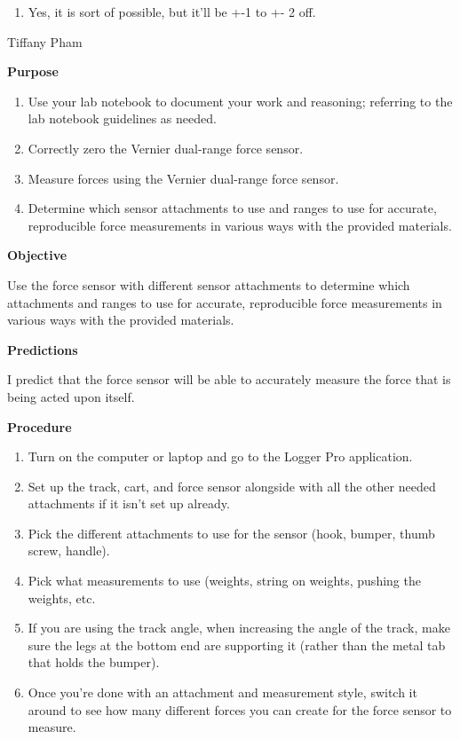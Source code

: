 \documentclass[idxtotoc,hyperref,openany]{labbook} %
\begin{document}

\begin{enumerate}
    \item Yes, it is sort of possible, but it'll be +-1 to +- 2 off.
\end{enumerate}


\vspace{-5mm}
Tiffany Pham

\textbf{Purpose}
\begin{enumerate}
    \item Use your lab notebook to document your work and reasoning; referring to the lab notebook guidelines as needed.
    \item Correctly zero the Vernier dual-range force sensor.
    \item Measure forces using the Vernier dual-range force sensor.
    \item Determine which sensor attachments to use and ranges to use for accurate, reproducible force measurements in various ways with the provided materials.
\end{enumerate}

\hfill \break
\textbf{Objective}

Use the force sensor with different sensor attachments to determine which attachments and ranges to use for accurate, reproducible force measurements in various ways with the provided materials.

\hfill \break
\textbf{Predictions}

I predict that the force sensor will be able to accurately measure the force that is being acted upon itself.

\hfill \break
\textbf{Procedure}
\begin{enumerate}
    \item Turn on the computer or laptop and go to the Logger Pro application.
    \item Set up the track, cart, and force sensor alongside with all the other needed attachments if it isn't set up already.
    \item Pick the different attachments to use for the sensor (hook, bumper, thumb screw, handle).
    \item Pick what measurements to use (weights, string on weights, pushing the weights, etc.
    \item If you are using the track angle, when increasing the angle of the track, make sure the legs at the bottom end are supporting it (rather than the metal tab that holds the bumper).
    \item Once you're done with an attachment and measurement style, switch it around to see how many different forces you can create for the force sensor to measure.
\end{enumerate}
\end{document}
